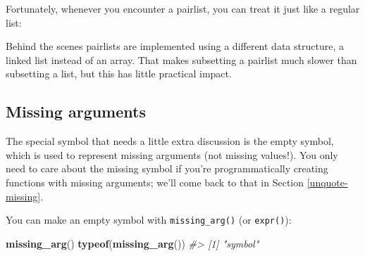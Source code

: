 \documentclass[]{book}
\newenvironment{Shaded}{\begin{snugshade}}{\end{snugshade}}
\newcommand{\CommentTok}[1]{\textcolor[rgb]{0.37,0.37,0.37}{\textit{#1}}}
\newcommand{\ControlFlowTok}[1]{\textcolor[rgb]{0.27,0.27,0.27}{\textbf{#1}}}
\newcommand{\DataTypeTok}[1]{\textcolor[rgb]{0.27,0.27,0.27}{#1}}
\newcommand{\DecValTok}[1]{\textcolor[rgb]{0.06,0.06,0.06}{#1}}
\newcommand{\KeywordTok}[1]{\textcolor[rgb]{0.27,0.27,0.27}{\textbf{#1}}}
\newcommand{\NormalTok}[1]{#1}
\newcommand{\OperatorTok}[1]{\textcolor[rgb]{0.43,0.43,0.43}{\textbf{#1}}}
\newcommand{\StringTok}[1]{\textcolor[rgb]{0.5,0.5,0.5}{#1}}
\begin{document}
\begin{Shaded}
\end{Shaded}

Fortunately, whenever you encounter a pairlist, you can treat it just like a regular list:

\begin{Shaded}
\end{Shaded}

Behind the scenes pairlists are implemented using a different data structure, a linked list instead of an array. That makes subsetting a pairlist much slower than subsetting a list, but this has little practical impact.

\hypertarget{empty-symbol}{%
\subsection{Missing arguments}\label{empty-symbol}}


The special symbol that needs a little extra discussion is the empty symbol, which is used to represent missing arguments (not missing values!). You only need to care about the missing symbol if you're programmatically creating functions with missing arguments; we'll come back to that in Section \ref{unquote-missing}.

You can make an empty symbol with \texttt{missing\_arg()} (or \texttt{expr()}):

\begin{Shaded}
\begin{Highlighting}[]
\KeywordTok{missing_arg}\NormalTok{()}
\KeywordTok{typeof}\NormalTok{(}\KeywordTok{missing_arg}\NormalTok{())}
\CommentTok{#> [1] "symbol"}
\end{Highlighting}
\end{Shaded}
\end{document}
